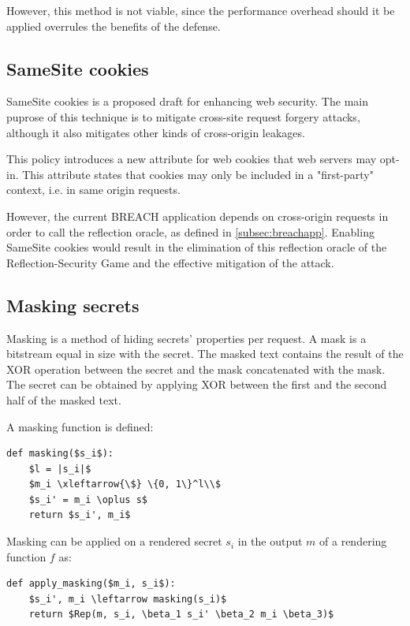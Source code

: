 \documentclass{sig-alternate-05-2015}
\begin{document}
However, this method is not viable, since the performance overhead should it be
applied overrules the benefits of the defense.

\subsection{SameSite cookies}\label{subsec:samesite}
SameSite cookies \cite{c8} is a proposed draft for enhancing web security. The
main puprose of this technique is to mitigate cross-site request forgery
attacks, although it also mitigates other kinds of cross-origin leakages.

This policy introduces a new attribute for web cookies that web servers may
opt-in. This attribute states that cookies may only be included in a
"first-party" context, i.e. in same origin requests.

However, the current BREACH application depends on cross-origin requests in
order to call the reflection oracle, as defined in \ref{subsec:breachapp}.
Enabling SameSite cookies would result in the elimination of this reflection
oracle of the Reflection-Security Game and the effective mitigation of the
attack.

\subsection{Masking secrets}\label{subsec:masking}
Masking is a method of hiding secrets' properties per request. A mask is a
bitstream equal in size with the secret. The masked text contains the result of
the XOR operation between the secret and the mask concatenated with the mask.
The secret can be obtained by applying XOR between the first and the second
half of the masked text.

A masking function is defined:

\begin{lstlisting}[texcl,mathescape]
def masking($s_i$):
    $l = |s_i|$
    $m_i \xleftarrow{\$} \{0, 1\}^l\\$
    $s_i' = m_i \oplus s$
    return $s_i', m_i$
\end{lstlisting}

Masking can be applied on a rendered secret $s_i$ in the output $m$ of a
rendering function $f$ as:

\begin{lstlisting}[texcl,mathescape]
def apply_masking($m_i, s_i$):
    $s_i', m_i \leftarrow masking(s_i)$
    return $Rep(m, s_i, \beta_1 s_i' \beta_2 m_i \beta_3)$
\end{lstlisting}
\end{document}
